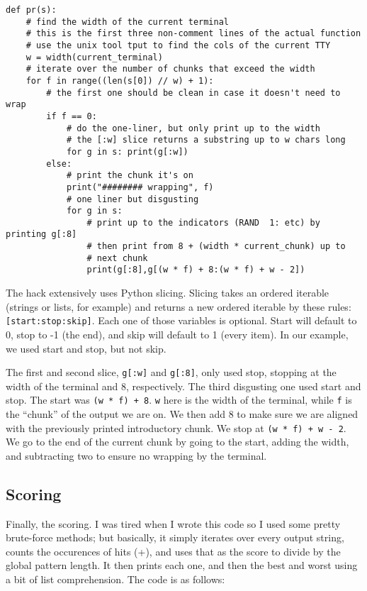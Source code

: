 \documentclass[11pt]{article}
\begin{document}
\begin{lstlisting}
def pr(s):
	# find the width of the current terminal
	# this is the first three non-comment lines of the actual function
	# use the unix tool tput to find the cols of the current TTY
	w = width(current_terminal)
	# iterate over the number of chunks that exceed the width
	for f in range((len(s[0]) // w) + 1):
		# the first one should be clean in case it doesn't need to wrap
		if f == 0:
			# do the one-liner, but only print up to the width
			# the [:w] slice returns a substring up to w chars long
			for g in s: print(g[:w])
		else:
			# print the chunk it's on
			print("######## wrapping", f)
			# one liner but disgusting
			for g in s:
				# print up to the indicators (RAND  1: etc) by printing g[:8]
				# then print from 8 + (width * current_chunk) up to
				# next chunk
				print(g[:8],g[(w * f) + 8:(w * f) + w - 2])
\end{lstlisting}

The hack extensively uses Python slicing.
Slicing takes an ordered iterable (strings or lists, for example) and returns a new ordered iterable by these rules: \texttt{[start:stop:skip]}.
Each one of those variables is optional.
Start will default to 0, stop to -1 (the end), and skip will default to 1 (every item).
In our example, we used start and stop, but not skip.

The first and second slice, \texttt{g[:w]} and \texttt{g[:8]}, only used stop, stopping at the width of the terminal and 8, respectively.
The third disgusting one used start and stop.
The start was \texttt{(w * f) + 8}.
\texttt{w} here is the width of the terminal, while \texttt{f} is the ``chunk'' of the output we are on.
We then add 8 to make sure we are aligned with the previously printed introductory chunk.
We stop at \texttt{(w * f) + w - 2}.
We go to the end of the current chunk by going to the start, adding the width, and subtracting two to ensure no wrapping by the terminal.

\subsection{Scoring}

Finally, the scoring.
I was tired when I wrote this code so I used some pretty brute-force methods; but basically, it simply iterates over every output string, counts the occurences of hits (+), and uses that as the score to divide by the global pattern length.
It then prints each one, and then the best and worst using a bit of list comprehension.
The code is as follows:
\end{document}
